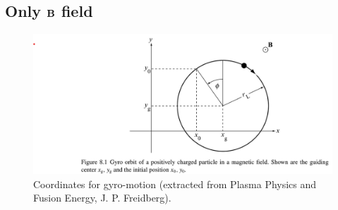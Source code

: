 \documentclass[a4paper,11pt]{report}
\begin{document}
\subsection{Only $\mathbf{B}$ field}
\begin{figure}[ht]
    \centering
    \includegraphics[width=\textwidth]{../../images/gyromotion_coordinates.png}
    \caption{Coordinates for gyro-motion (extracted from Plasma Physics and Fusion Energy, J. P. Freidberg).}
    \label{fig:gyromotion_coordiantes}
\end{figure}
\end{document}
